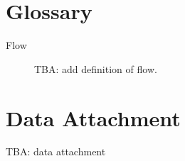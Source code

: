 \documentclass[
    digital,
    color,
    11pt,
    nocover,
    table,  %
    nolof,  %
    nolot,  %
    microtype,
]{fithesis3}
\begin{document}








\printbibliography[heading=bibintoc]

\appendix

\chapter{Glossary}
\label{chap:glossary}

\begin{description}
    \item[Flow] TBA: add definition of flow.
\end{description}

\chapter{Data Attachment}
\label{chap:data}

TBA: data attachment
\end{document}
